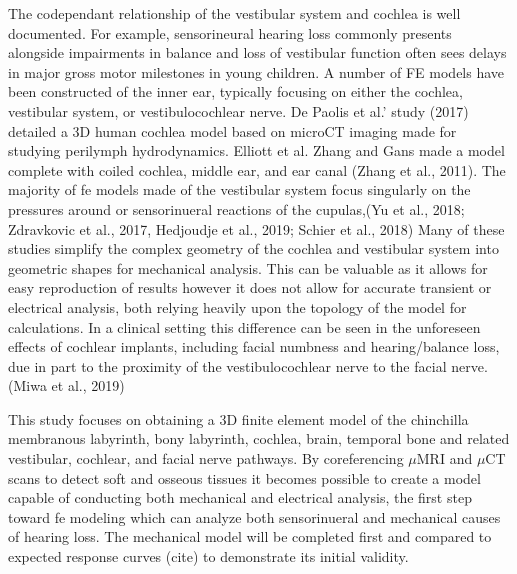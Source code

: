 \documentclass[12pt]{article}
\begin{document}
The codependant relationship of the vestibular system and cochlea is well documented. For example, sensorineural hearing loss commonly presents alongside impairments in balance and loss of vestibular function often sees delays in major gross motor milestones in young children. \cite{cushing} A number of FE models have been constructed of the inner ear, typically focusing on either the cochlea, vestibular system, or vestibulocochlear nerve. De Paolis et al.’ study (2017) detailed a 3D human cochlea model based on microCT imaging made for studying perilymph hydrodynamics. Elliott et al. Zhang and Gans made a model complete with coiled cochlea, middle ear, and ear canal (Zhang et al., 2011). The majority of fe models made of the vestibular system focus singularly on the pressures around or sensorinueral reactions of the cupulas,(Yu et al., 2018; Zdravkovic et al., 2017, Hedjoudje et al., 2019; Schier et al., 2018) Many of these studies simplify the complex geometry of the cochlea and vestibular system into geometric shapes for mechanical analysis. This can be valuable as it allows for easy reproduction of results however it does not allow for accurate transient or electrical analysis, both relying heavily upon the topology of the model for calculations. In a clinical setting this difference can be seen in the unforeseen effects of cochlear implants, including facial numbness and hearing/balance loss, due in part to the proximity of the vestibulocochlear nerve to the facial nerve. (Miwa et al., 2019)


This study focuses on obtaining a 3D finite element model of the chinchilla membranous labyrinth, bony labyrinth, cochlea, brain, temporal bone and related vestibular, cochlear, and facial nerve pathways. By coreferencing $\mu$MRI and $\mu$CT scans to detect soft and osseous tissues it becomes possible to create a model capable of conducting both mechanical and electrical analysis, the first step toward fe modeling which can analyze both sensorinueral and mechanical causes of hearing loss. The mechanical model will be completed first and compared to expected response curves (cite) to demonstrate its initial validity.
   
\end{document}
